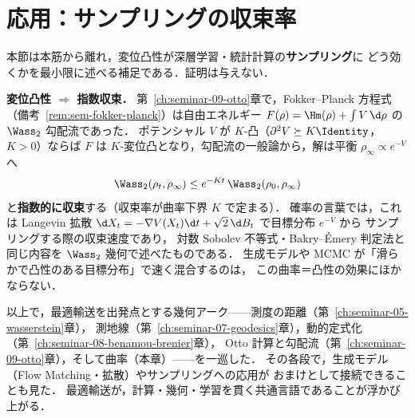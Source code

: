 \section{応用：サンプリングの収束率}
\label{sec:sem-curvature-sampling}

本節は本筋から離れ，変位凸性が深層学習・統計計算の\textbf{サンプリング}に
どう効くかを最小限に述べる補足である．証明は与えない．

\begin{memo*}
  \textbf{変位凸性 $\Rightarrow$ 指数収束．}
  第~\ref{ch:seminar-09-otto}章で，Fokker--Planck 方程式
  （備考~\ref{rem:sem-fokker-planck}）は自由エネルギー
  $F(\rho)=\Hm(\rho)+\int V\,\d\rho$ の $\Wass_2$ 勾配流であった．
  ポテンシャル $V$ が $K$-凸（$\partial^2 V\succeq K\Identity$，$K>0$）ならば
  $F$ は $K$-変位凸となり，勾配流の一般論から，解は平衡
  $\rho_\infty\propto e^{-V}$ へ
  \[
    \Wass_2(\rho_t,\rho_\infty)\le e^{-Kt}\,\Wass_2(\rho_0,\rho_\infty)
  \]
  と\textbf{指数的に収束}する（収束率が曲率下界 $K$ で定まる）．
  確率の言葉では，これは Langevin 拡散
  $\d X_t=-\nabla V(X_t)\d t+\sqrt2\,\d B_t$ で目標分布 $e^{-V}$ から
  サンプリングする際の収束速度であり，
  対数 Sobolev 不等式・Bakry--Émery 判定法と同じ内容を $\Wass_2$ 幾何で述べたものである．
  生成モデルや MCMC が「滑らかで凸性のある目標分布」で速く混合するのは，
  この曲率＝凸性の効果にほかならない．
\end{memo*}

以上で，最適輸送を出発点とする幾何アーク——測度の距離（第~\ref{ch:seminar-05-wasserstein}章），
測地線（第~\ref{ch:seminar-07-geodesics}章），動的定式化（第~\ref{ch:seminar-08-benamou-brenier}章），
Otto 計算と勾配流（第~\ref{ch:seminar-09-otto}章），そして曲率（本章）——を一巡した．
その各段で，生成モデル（Flow Matching・拡散）やサンプリングへの応用が
おまけとして接続できることも見た．
最適輸送が，計算・幾何・学習を貫く共通言語であることが浮かび上がる．
